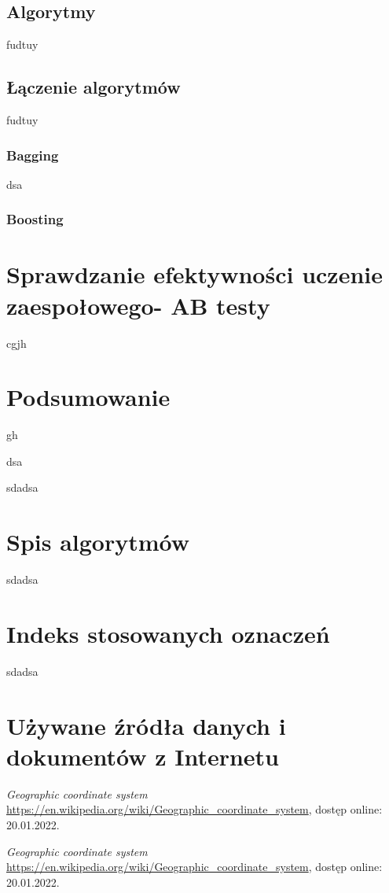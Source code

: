 \documentclass[wmii, inf, mgr]{uwmthesis}
\begin{document}
\section{Algorytmy}
fudtuy


\section{Łączenie algorytmów}
fudtuy
\subsection{Bagging}
dsa

\subsection{Boosting}


\chapter{Sprawdzanie efektywności uczenie zaespołowego- AB testy}

cgjh

\chapter{Podsumowanie}

gh


\listoffigures
dsa

\listoftables
sdadsa

\chapter{Spis algorytmów}
sdadsa

\chapter{Indeks stosowanych oznaczeń}
sdadsa

\chapter{Używane źródła danych i dokumentów z Internetu}
\textit{Geographic coordinate system}
\url{https://en.wikipedia.org/wiki/Geographic_coordinate_system}, dostęp online: 20.01.2022.


\textit{Geographic coordinate system}
 \url{https://en.wikipedia.org/wiki/Geographic_coordinate_system}, dostęp online: 20.01.2022.
\end{document}
